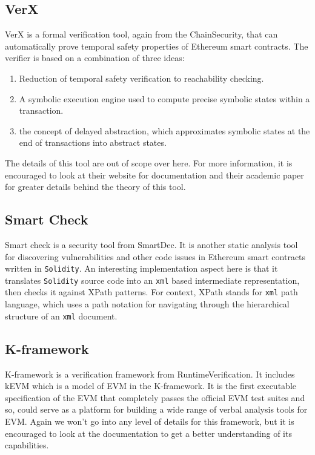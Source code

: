 \subsection{VerX}\label{verx}

VerX is a formal verification tool, again from the ChainSecurity, that
can automatically prove temporal safety properties of Ethereum smart
contracts. The verifier is based on a combination of three ideas:

\begin{enumerate}
\def\labelenumi{\arabic{enumi}.}
\tightlist
\item
  Reduction of temporal safety verification to reachability checking.
\item
  A symbolic execution engine used to compute precise symbolic states
  within a transaction.
\item
  the concept of delayed abstraction, which approximates symbolic states
  at the end of transactions into abstract states.
\end{enumerate}

The details of this tool are out of scope over here. For more
information, it is encouraged to look at their website for documentation
and their academic paper for greater details behind the theory of this
tool.

\subsection{Smart Check}\label{smart-check}

Smart check is a security tool from SmartDec. It is another static
analysis tool for discovering vulnerabilities and other code issues in
Ethereum smart contracts written in \texttt{Solidity}. An interesting
implementation aspect here is that it translates \texttt{Solidity}
source code into an \texttt{xml} based intermediate representation, then
checks it against XPath patterns. For context, XPath stands for
\texttt{xml} path language, which uses a path notation for navigating
through the hierarchical structure of an \texttt{xml} document.

\subsection{K-framework}\label{k-framework}

K-framework is a verification framework from RuntimeVerification. It
includes kEVM which is a model of EVM in the K-framework. It is the
first executable specification of the EVM that completely passes the
official EVM test suites and so, could serve as a platform for building
a wide range of verbal analysis tools for EVM. Again we won't go into
any level of details for this framework, but it is encouraged to look at
the documentation to get a better understanding of its capabilities.

